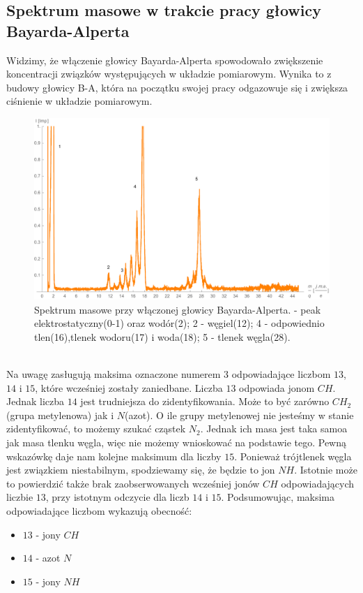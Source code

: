 \documentclass[paper=a4, fontsize=12pt]{scrartcl}
\begin{document}
\subsection{Spektrum masowe w trakcie pracy głowicy Bayarda-Alperta}
Widzimy, że włączenie głowicy Bayarda-Alperta spowodowało zwiększenie koncentracji związków występujących w układzie pomiarowym. Wynika to z budowy głowicy B-A, która na początku swojej pracy odgazowuje się i zwiększa ciśnienie w układzie pomiarowym. \\
\begin{figure}[h!]
\centering
\includegraphics[width=0.7\linewidth]{spekba}
\caption{Spektrum masowe przy włączonej głowicy Bayarda-Alperta. - peak elektrostatyczny(0-1) oraz wodór(2); 2 - węgiel(12); 4 - odpowiednio tlen(16),\newline tlenek wodoru(17) i woda(18); 5 - tlenek węgla(28).}
\label{fig:spekba}
\end{figure}\\
Na uwagę zasługują maksima oznaczone numerem $3$ odpowiadające liczbom $13$, $14$ i $15$, które wcześniej zostały zaniedbane. Liczba $13$ odpowiada jonom $CH$. Jednak liczba $14$ jest trudniejsza do zidentyfikowania. Może to być zarówno $CH_2$(grupa metylenowa) jak i $N$(azot). O ile grupy metylenowej nie jesteśmy w stanie zidentyfikować, to możemy szukać cząstek $N_2$. Jednak ich masa jest taka samoa jak masa tlenku węgla, więc nie możemy wnioskować na podstawie tego. Pewną wskazówkę daje nam kolejne maksimum dla liczby $15$. Ponieważ trójtlenek węgla jest związkiem niestabilnym, spodziewamy się, że będzie to jon $NH$. Istotnie może to powierdzić także brak zaobserwowanych wcześniej jonów $CH$ odpowiadających liczbie $13$, przy istotnym odczycie dla liczb $14$ i $15$. Podsumowując, maksima odpowiadające liczbom wykazują obecność:
\begin{itemize}
	\item $13$ - jony $CH$
	\item $14$ - azot $N$
	\item $15$ - jony $NH$
\end{itemize}
\newpage
\end{document}
